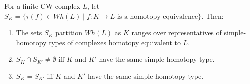 For a finite CW complex $L$, let $S_K = \{\tau(f) \in Wh(L) \mid f: K \to L \text{ is a homotopy equivalence}\}$. Then:
\begin{enumerate}
\item[(a)] The sets $S_K$ partition $Wh(L)$ as $K$ ranges over representatives of simple-homotopy types of complexes homotopy equivalent to $L$.
\item[(b)] $S_K \cap S_{K'} \neq \emptyset$ iff $K$ and $K'$ have the same simple-homotopy type.
\item[(c)] $S_K = S_{K'}$ iff $K$ and $K'$ have the same simple-homotopy type.
\end{enumerate}
